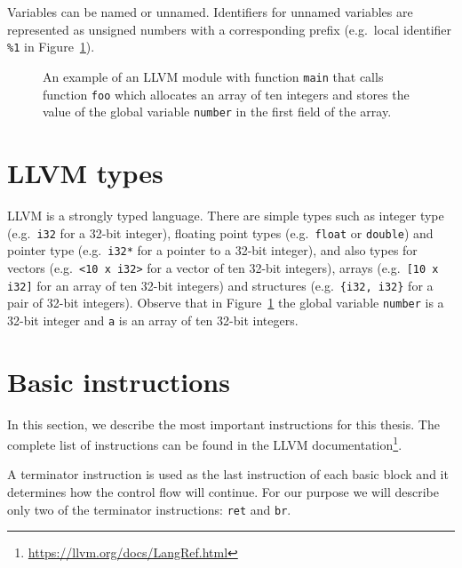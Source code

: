 Variables can be named or unnamed. Identifiers for unnamed variables are
represented as unsigned numbers with a corresponding prefix (e.g.~local
identifier \texttt{\%1} in Figure~\ref{fig:llvm_example}).

\begin{figure}[t]
 
 \caption{An example of an LLVM module with function \texttt{main} that calls
 function \texttt{foo} which allocates an array of ten integers and stores the
 value of the global variable \texttt{number} in the first field of the array.}
 \label{fig:llvm_example}
\end{figure}

\section{LLVM types}

LLVM is a strongly typed language. There are simple types such as integer type
(e.g.~\texttt{i32} for a 32-bit integer), floating point types
(e.g.~\texttt{float} or \texttt{double}) and pointer type (e.g.~\texttt{i32*}
for a pointer to a 32-bit integer), and also types for vectors
(e.g.~\texttt{<10 x i32>} for a vector of ten 32-bit integers), arrays
(e.g.~\texttt{[10 x i32]} for an array of ten 32-bit integers) and
structures (e.g.~\texttt{\{i32, i32\}} for a pair of 32-bit integers).
Observe that in Figure~\ref{fig:llvm_example} the global variable
\texttt{number} is a 32-bit integer and \texttt{a} is an array of ten
32-bit integers.

\section{Basic instructions}

In this section, we describe the most important instructions for this thesis. The
complete list of instructions can be found in the LLVM
documentation\footnote{\url{https://llvm.org/docs/LangRef.html}}.

A terminator instruction is used as the last instruction of each basic block
and it determines how the control flow will continue. For our purpose we will
describe only two of the terminator instructions: \texttt{ret} and \texttt{br}.

